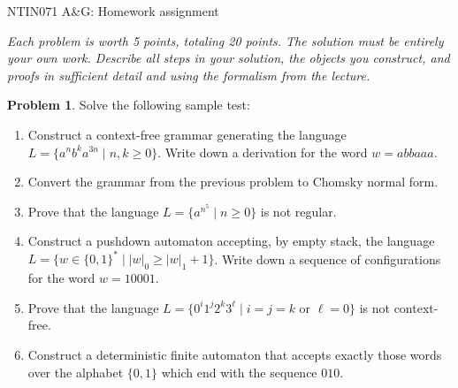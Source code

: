 \documentclass[a4paper,12pt]{article}
\theoremstyle{definition}
\newtheorem{problem}{Problem}
\begin{document}
\begin{center}
    \large{NTIN071 A\&G: Homework assignment}    
\end{center}


{\it  Each problem is worth 5 points, totaling 20 points. The solution must be entirely your own work. Describe all steps in your solution, the objects you construct, and proofs in sufficient detail and using the formalism from the lecture.}

\bigskip

\begin{problem}
    Solve the following sample test:

    \begin{enumerate}
        \item Construct a context-free grammar generating the language $L=\{a^nb^ka^{3n}\mid n,k\geq 0\}$. Write down a derivation for the word $w=abbaaa$.
        \item Convert the grammar from the previous problem to Chomsky normal form.
        \item Prove that the language $L=\{a^{n^5}\mid n\geq 0\}$ is not regular.
        \item Construct a pushdown automaton accepting, by empty stack, the language $L=\{w\in\{0,1\}^*\mid |w|_0\geq |w|_1 + 1\}$. Write down a sequence of configurations for the word $w=10001$.
        \item Prove that the language $L=\{0^i1^j2^k3^\ell\mid i=j=k\text{ or }\ell=0\}$ is not context-free.
        \item Construct a deterministic finite automaton that accepts exactly those words over the alphabet $\{0,1\}$ which end with the sequence $010$.
    \end{enumerate}

\end{problem}


\bigskip
\end{document}

